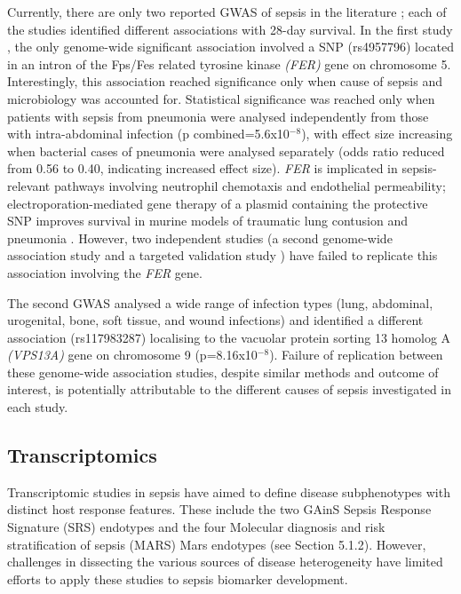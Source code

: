 Currently, there are only two reported GWAS of sepsis in the literature \parencite{Rautanen2015} \parencite{Scherag2016}; each of the studies identified different associations with 28-day survival. In the first study \parencite{Rautanen2015}, the only genome-wide significant association involved a SNP (rs4957796) located in an intron of the Fps/Fes related tyrosine kinase \textit{(FER)} gene on chromosome 5. Interestingly, this association reached significance only when cause of sepsis and microbiology was accounted for. Statistical significance was reached only when patients with sepsis from pneumonia were analysed independently from those with intra-abdominal infection (p combined=5.6x10$^{-8}$), with effect size increasing when bacterial cases of pneumonia were analysed separately (odds ratio reduced from 0.56 to 0.40, indicating increased effect size). \textit{FER} is implicated in sepsis-relevant pathways involving neutrophil chemotaxis and endothelial permeability; electroporation-mediated gene therapy of a plasmid containing the protective SNP improves survival in murine models of traumatic lung contusion and pneumonia \parencite{Dolgachev2016}. However, two independent studies (a second genome-wide association study \parencite{Scherag2016} and a targeted validation study \parencite{Schoneweck2015}) have failed to replicate this association involving the \textit{FER} gene. 

The second GWAS \parencite{Scherag2016} analysed a wide range of infection types (lung, abdominal, urogenital, bone, soft tissue, and wound infections) and identified a different association (rs117983287) localising to the vacuolar protein sorting 13 homolog A \textit{(VPS13A)} gene on chromosome 9 (p=8.16x10$^{-8}$). Failure of replication between these genome-wide association studies, despite similar methods and outcome of interest, is potentially attributable to the different causes of sepsis investigated in each study. 

\subsection{Transcriptomics}
Transcriptomic studies in sepsis have aimed to define disease subphenotypes with distinct host response features. These include the two GAinS Sepsis Response Signature (SRS) endotypes \parencite{Davenport2016} and the four Molecular diagnosis and risk stratification of sepsis (MARS) Mars endotypes \parencite{Scicluna2017} (see Section 5.1.2). However, challenges in dissecting the various sources of disease heterogeneity have limited efforts to apply these studies to sepsis biomarker development. 

